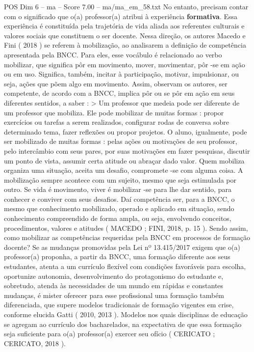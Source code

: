 \begin{textsample}{POS Dim 6 – ma – Score 7.00 – ma/ma\_em\_58.txt}
No entanto, precisam contar com o significado que o(a) professor(a) atribui à experiência \textbf{formativa}.
Essa experiência é constituída pela trajetória de vida aliada aos referentes culturais e valores sociais que constituem o ser docente.
Nessa direção, os autores Macedo e Fini ( 2018 ) se referem à mobilização, ao analisarem a definição de competência apresentada pela BNCC.
Para eles, esse vocábulo é relacionado ao verbo mobilizar, que significa pôr em movimento, mover, movimentar, pôr -se em ação ou em uso.
Significa, também, incitar à participação, motivar, impulsionar, ou seja, ações que põem algo em movimento.
Assim, observam os autores, ser competente, de acordo com a BNCC, implica pôr ou se pôr em ação em seus diferentes sentidos, a saber : > Um professor que medeia pode ser diferente de um professor que mobiliza.
Ele pode mobilizar de muitas formas : propor exercícios ou tarefas a serem realizados, configurar rodas de conversa sobre determinado tema, fazer reflexões ou propor projetos.
O aluno, igualmente, pode ser mobilizado de muitas formas : pelas ações ou motivações de seu professor, pelo intercâmbio com seus pares, por suas motivações em fazer pesquisas, discutir um ponto de vista, assumir certa atitude ou abraçar dado valor.
Quem mobiliza organiza uma situação, aceita um desafio, compromete -se com alguma coisa.
A mobilização sempre acontece com um sujeito, mesmo que seja estimulada por outro.
Se vida é movimento, viver é mobilizar -se para lhe dar sentido, para conhecer e conviver com seus desafios.
Daí competência ser, para a BNCC, o mesmo que conhecimento mobilizado, operado e aplicado em situação, sendo conhecimento compreendido de forma ampla, ou seja, envolvendo conceitos, procedimentos, valores e atitudes ( MACEDO ; FINI, 2018, p. 15 ).
Sendo assim, como mobilizar as competências requeridas pela BNCC em processos de formação docente?
Se as mudanças promovidas pela Lei nº 13.415/2017 exigem que o(a) professor(a) proponha, a partir da BNCC, uma formação diferente aos seus estudantes, atenta a um currículo flexível com condições favoráveis para escolha, oportunize autonomia, desenvolvimento do protagonismo do estudante e, sobretudo, atenda às necessidades de um mundo em rápidas e constantes mudanças, é mister oferecer para esse profissional uma formação também diferenciada, que supere modelos tradicionais de formação vigentes em crise, conforme elucida Gatti ( 2010, 2013 ).
Modelos nos quais disciplinas de educação se agregam ao currículo dos bacharelados, na expectativa de que essa formação seja suficiente para o(a) professor(a) exercer seu ofício ( CERICATO ; CERICATO, 2018 ).

\end{textsample}
